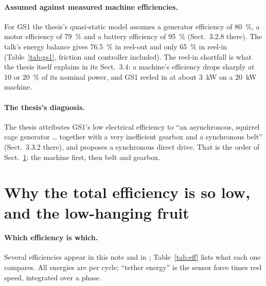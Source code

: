 \documentclass[11pt,a4paper]{article}
\begin{document}
\paragraph{Assumed against measured machine efficiencies.} For GS1 the thesis's
quasi-static model assumes a generator efficiency of \SI{80}{\percent}, a motor
efficiency of \SI{79}{\percent} and a battery efficiency of \SI{95}{\percent}
(Sect.~3.2.8 there). The talk's energy balance gives \SI{76.5}{\percent} in
reel-out and only \SI{65}{\percent} in reel-in (Table~\ref{tab:gs1}, friction
and controller included). The reel-in shortfall is what the thesis itself
explains in its Sect.~3.4: a machine's efficiency drops sharply at 10 or
\SI{20}{\percent} of its nominal power, and GS1 reeled in at about \SI{3}{kW}
on a \SI{20}{kW} machine.

\paragraph{The thesis's diagnosis.} The thesis attributes GS1's low electrical
efficiency to ``an asynchronous, squirrel cage generator \ldots{} together with
a very inefficient gearbox and a synchronous belt'' (Sect.~3.3.2 there), and
proposes a synchronous direct drive. That is the order of
Sect.~\ref{sec:fruit}: the machine first, then belt and gearbox.

\section{Why the total efficiency is so low, and the low-hanging fruit}
\label{sec:fruit}

\paragraph{Which efficiency is which.} Several efficiencies appear in this note
and in \cite{fechner2011}; Table~\ref{tab:eff} lists what each one compares.
All energies are per cycle; ``tether energy'' is the sensor force times reel
speed, integrated over a phase.
\end{document}
